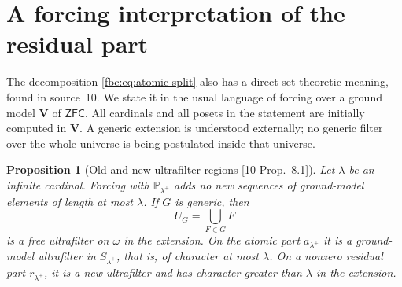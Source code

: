 \documentclass[11pt,letterpaper]{article}
\newtheorem{proposition}[theorem]{Proposition}
\theoremstyle{definition}
\theoremstyle{remark}
\newcommand{\om}{\omega}
\newcommand{\PP}{\mathbb P}
\newcommand{\bV}{\mathbf V}
\newcommand{\ZFC}{\mathsf{ZFC}}
\newcommand{\src}[1]{\textup{[#1]}}
\begin{document}
\section{A forcing interpretation of the residual part}
\label{fbc:sec:forcing}

The decomposition \eqref{fbc:eq:atomic-split} also has a direct
set-theoretic meaning, found in source~10. We state it in the usual
language of forcing over a ground model $\bV$ of $\ZFC$. All cardinals
and all posets in the statement are initially computed in $\bV$. A
generic extension is understood externally; no generic filter over the
whole universe is being postulated inside that universe.

\begin{proposition}[Old and new ultrafilter regions \src{10 Prop.~8.1}]
\label{fbc:prop:forcing}
Let $\lambda$ be an infinite cardinal. Forcing with $\PP_{\lambda^+}$
adds no new sequences of ground-model elements of length at most
$\lambda$. If $G$ is generic, then
\[
 U_G=\bigcup_{F\in G}F
\]
is a free ultrafilter on $\om$ in the extension. On the atomic part
$a_{\lambda^+}$ it is a ground-model ultrafilter in $S_{\lambda^+}$, that
is, of character at most $\lambda$. On a nonzero residual part
$r_{\lambda^+}$, it is a new ultrafilter and has character greater than
$\lambda$ in the extension.
\end{proposition}
\end{document}
